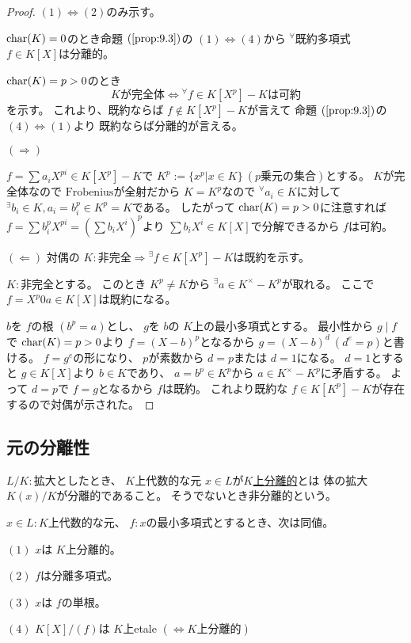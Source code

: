 \documentclass[../master_galois_theory]{subfiles}
\begin{document}
\begin{proof}
  $(1) \Leftrightarrow (2)$のみ示す。

  $\mathrm{char}(K) = 0$のとき命題 $(\mathrm{\ref{prop:9.3}})$の
  $(1) \Leftrightarrow (4)$から ${}^\forall$既約多項式 $f \in K[X]$は分離的。

  $\mathrm{char}(K) = p > 0$のとき
  \[
  Kが完全体 \Leftrightarrow {}^\forall f \in K[X^p] - K は可約
  \]
  を示す。
  これより、既約ならば $f \notin K[X^p] - K$が言えて
  命題 $(\mathrm{\ref{prop:9.3}})$の $(4) \Leftrightarrow (1)$より
  既約ならば分離的が言える。

  $(\Rightarrow)$

  $f = \sum a_i X^{pi} \in K[X^p] - K$で
  $K^p := \{ x^p | x \in K \} \  (p乗元の集合)$とする。
  $K$が完全体なので $\mathrm{Frobenius}$が全射だから
  $K = K^p$なので ${}^\forall a_i \in K$に対して
  ${}^\exists b_i \in K , a_i = b_i^p \in K^p = K$である。
  したがって $\mathrm{char}(K) = p > 0$に注意すれば
  $f = \sum b_i^p X^{pi} = (\sum b_i X^i)^p$より
  $\sum b_i X^i \in K[X]$で分解できるから $f$は可約。

  $(\Leftarrow)$
  対偶の $K:非完全 \Rightarrow {}^\exists f \in K[X^p] - K は既約$を示す。

  $K:$非完全とする。
  このとき $K^p \neq K$から ${}^\exists a \in K^\times - K^p$が取れる。
  ここで $f = X^p 0 a \in K[X]$は既約になる。

  $b$を $f$の根 $(b^p = a)$とし、
  $g$を $b$の $K$上の最小多項式とする。
  最小性から $g \mid f$で $\mathrm{char}(K) = p > 0$より
  $f = (X - b)^p$となるから
  $g = (X - b)^d \  (d^e = p)$と書ける。
  $f = g^e$の形になり、 $p$が素数から
  $d = p$または $d = 1$になる。
  $d = 1$とすると $g \in K[X]$より $b \in K$であり、 $a = b^p \in K^p$から
  $a \in K^\times - K^p$に矛盾する。
  よって $d = p$で $f = g$となるから $f$は既約。
  これより既約な $f \in K[K^p] - K$が存在するので対偶が示された。
\end{proof}

\subsection{元の分離性}

\begin{defi}
  $L/K:$拡大としたとき、
  $K$上代数的な元 $x \in L$が\underline{$K$上分離的}とは
  体の拡大$K(x)/K$が分離的であること。
  そうでないとき非分離的という。
\end{defi}

\begin{prop} \label{prop:9.5}
  $x \in L:K$上代数的な元、 $f:x$の最小多項式とするとき、次は同値。

  $(1)$
  $x$は $K$上分離的。

  $(2)$
  $f$は分離多項式。

  $(3)$
  $x$は $f$の単根。

  $(4)$
  $K[X]/(f)$は $K$上\rm{etale} $(\Leftrightarrow K上分離的)$
\end{prop}
\end{document}
